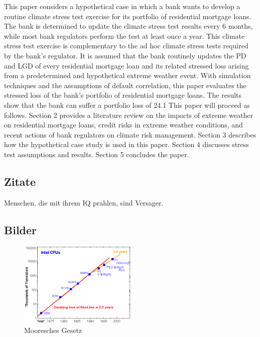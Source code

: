 This paper considers a hypothetical case in which a bank wants to develop a routine climate stress test exercise for its portfolio of residential mortgage loans. The bank is determined to update the climate stress test results every 6 months, while most bank regulators perform the test at least once a year. This climate stress test exercise is complementary to the ad hoc climate stress tests required by the bank’s regulator. It is assumed that the bank routinely updates the PD and LGD of every residential mortgage loan and its related stressed loss arising from a predetermined and hypothetical extreme weather event. With simulation techniques and the assumptions of default correlation, this paper evaluates the stressed loss of the bank’s portfolio of residential mortgage loans. The results show that the bank can suffer a portfolio loss of 24.1%
This paper will proceed as follows. Section 2 provides a literature review on the impacts of extreme weather on residential mortgage loans, credit risks in extreme weather conditions, and recent actions of bank regulators on climate risk management. Section 3 describes how the hypothetical case study is used in this paper. Section 4 discusses stress test assumptions and results. Section 5 concludes the paper.
\subsection{Zitate}
Menschen, die mit ihrem IQ prahlen, sind Versager.

\subsection{Bilder}
\begin{figure}[H] 
    \centering
    \includegraphics[width=0.5\textwidth]{figures/figure_example.png}
    \caption{Mooresches Gesetz}
\end{figure}

